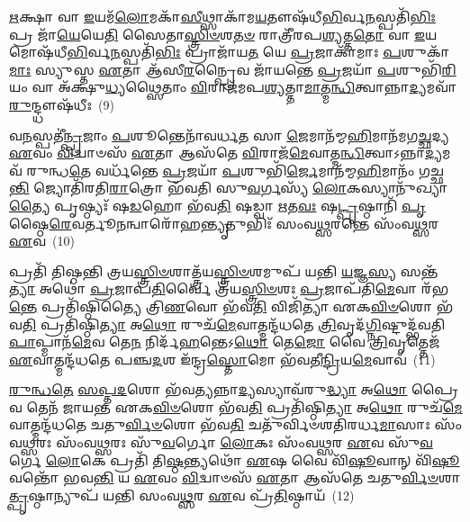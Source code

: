 {\anuvakamend[{\-\ul{𑌮}\-\-\ul{𑌨𑍁}\-𑌷𑍍𑌯᳴𑌸𑍍𑌯 𑌮\-\ul{𑌧𑍍𑌯}\-𑌤𑌃 \ul{𑌪}\-𑌶\-\ul{𑌵}\-𑌸𑍍𑌤𑌾𑌭𑍍𑌯𑌾᳴\-\ul{𑌮𑍇}\-𑌵 𑌸𑌂᳴𑌵\-\ul{𑌥𑍍𑌸}\-𑌰𑌶𑍍𑌚𑌤𑍁᳴𑌰𑍍𑌵𑌿𑍞𑌶𑌤𑌿𑌶𑍍𑌚}]}%

\-\ul{𑌋}\-𑌕𑍍𑌷𑌾 𑌵𑌾 \ul{𑌇}\-𑌯𑌮᳴\-\ul{𑌲𑍋}\-𑌮𑌕𑌾᳴\-\ul{𑌸𑍀}\-𑌥𑍍𑌸𑌾𑌕𑌾᳴𑌮\-\ul{𑌯}\-𑌤𑍗𑌷᳴𑌧𑍀\-\ul{𑌭𑌿}\-𑌰𑍍𑌵\-\ul{𑌨}\-𑌸𑍍𑌪𑌤𑌿᳴\-\ul{𑌭𑌿𑌃} 𑌪𑍍𑌰 𑌜𑌾᳴\-\ul{𑌯𑍇}\-𑌯𑍇\-\ul{𑌤𑌿} 𑌸𑍈𑌤𑌾\-\ul{𑌸𑍍𑌤𑍍𑌰𑌿}\-\-\ul{𑍞}\-𑌶\-\ul{𑌤}\-\-\ul{𑍞} 𑌰𑌾𑌤𑍍𑌰𑍀᳴𑌰𑌪\-\ul{𑌶𑍍𑌯}\-𑌤𑍍𑌤\-\ul{𑌤𑍋} 𑌵𑌾 \ul{𑌇}\-𑌯𑌮𑍋𑌷᳴𑌧𑍀\-\ul{𑌭𑌿}\-𑌰𑍍𑌵\-\ul{𑌨}\-𑌸𑍍𑌪𑌤𑌿᳴\-\ul{𑌭𑌿𑌃} 𑌪𑍍𑌰𑌾𑌜𑌾᳴𑌯\-\ul{𑌤} 𑌯𑍇 \ul{𑌪𑍍𑌰}\-𑌜𑌾𑌕𑌾᳴𑌮𑌾𑌃 \ul{𑌪}\-𑌶𑍁𑌕𑌾᳴\-\ul{𑌮𑌾𑌃} 𑌸𑍍𑌯𑍁𑌸𑍍𑌤 \ul{𑌏}\-𑌤𑌾 𑌆᳴𑌸𑍀\-\ul{𑌰}\-𑌨𑍍𑌪𑍍𑌰𑍈𑌵 𑌜𑌾᳴𑌯𑌨𑍍𑌤𑍇 \ul{𑌪𑍍𑌰}\-𑌜𑌯𑌾᳴ \ul{𑌪}\-𑌶𑍁𑌭𑌿᳴\-\ul{𑌰𑌿}\-𑌯𑌂 𑌵𑌾 𑌅᳴𑌕𑍍𑌷𑍁\-\ul{𑌧𑍍𑌯}\-𑌥𑍍𑌸𑍈𑌤𑌾𑌂 \ul{𑌵𑌿}\-𑌰𑌾𑌜᳴𑌮𑌪\-\ul{𑌶𑍍𑌯}\-𑌤𑍍𑌤𑌾\-\ul{𑌮𑌾}\-𑌤𑍍𑌮\-\ul{𑌨𑍍𑌧𑌿}\-𑌤𑍍𑌵𑌾𑌨𑍍𑌨𑌾\-\ul{𑌦𑍍𑌯}\-𑌮𑌵𑌾᳴\-\ul{𑌰𑍁}\-𑌨𑍍𑌦𑍍𑌧𑍗𑌷᳴𑌧𑍀𑌃~(9)

𑌵\-\ul{𑌨}\-𑌸𑍍𑌪𑌤𑍀॑\-\ul{𑌨𑍍𑌪𑍍𑌰}\-𑌜𑌾𑌂 \ul{𑌪}\-𑌶𑍂𑌨𑍍𑌤𑍇𑌨𑌾᳴𑌵𑌰𑍍𑌧\-\ul{𑌤} 𑌸𑌾 \ul{𑌜𑍇}\-𑌮𑌾𑌨᳴𑌮𑍍𑌮\-\ul{𑌹𑌿}\-𑌮𑌾𑌨᳴𑌮𑌗\-\ul{𑌚𑍍𑌛}\-𑌦𑍍𑌯 \ul{𑌏}\-𑌵𑌂 \ul{𑌵𑌿}\-𑌦𑍍𑌵𑌾𑍞𑌸᳴ \ul{𑌏}\-𑌤𑌾 𑌆𑌸᳴𑌤𑍇 \ul{𑌵𑌿}\-𑌰𑌾𑌜᳴\-\ul{𑌮𑍇}\-𑌵𑌾𑌤𑍍𑌮\-\ul{𑌨𑍍𑌧𑌿}\-𑌤𑍍𑌵𑌾\-𑌽𑌨𑍍𑌨𑌾\-\ul{𑌦𑍍𑌯}\-𑌮𑌵᳴ 𑌰𑍁𑌨𑍍𑌧\-\ul{𑌤𑍇} 𑌵𑌰𑍍𑌧᳴𑌨𑍍𑌤𑍇 \ul{𑌪𑍍𑌰}\-𑌜𑌯𑌾᳴ \ul{𑌪}\-𑌶𑍁𑌭𑌿᳴\-\ul{𑌰𑍍𑌜𑍇}\-𑌮𑌾𑌨᳴𑌮𑍍𑌮\-\ul{𑌹𑌿}\-𑌮𑌾𑌨𑌂᳴ 𑌗𑌚𑍍𑌛\-\ul{𑌨𑍍𑌤𑌿} 𑌜𑍍𑌯𑍋𑌤𑌿᳴𑌰𑌤𑌿\-\ul{𑌰𑌾}\-𑌤𑍍𑌰𑍋 𑌭᳴𑌵𑌤𑌿 𑌸𑍁\-\ul{𑌵}\-𑌰𑍍𑌗𑌸𑍍𑌯᳴ \ul{𑌲𑍋}\-𑌕𑌸𑍍𑌯𑌾𑌨𑍁᳴\-𑌖𑍍𑌯𑌾\-\ul{𑌤𑍍𑌯𑍈} 𑌪𑍃𑌷𑍍𑌠𑍍𑌯𑌃᳴ 𑌷\-\ul{𑌡}\-𑌹𑍋 𑌭᳴𑌵\-\ul{𑌤𑌿} 𑌷𑌡𑍍𑌵𑌾 \ul{𑌋}\-𑌤\-\ul{𑌵𑌃} 𑌷\-\ul{𑌟𑍍𑌪𑍃}\-𑌷𑍍𑌠𑌾𑌨𑌿᳴ \ul{𑌪𑍃}\-𑌷𑍍𑌠𑍈\-\ul{𑌰𑍇}\-𑌵𑌰𑍍𑌤𑍂\-\ul{𑌨}\-𑌨𑍍𑌵𑌾𑌰𑍋᳴𑌹\-\ul{𑌨𑍍𑌤𑍍𑌯𑍃}\-𑌤𑍁𑌭𑌿𑌃᳴ 𑌸𑌂𑌵\-\ul{𑌥𑍍𑌸}\-𑌰𑌨𑍍𑌤𑍇 𑌸𑌂᳴𑌵\-\ul{𑌥𑍍𑌸}\-𑌰 \ul{𑌏}\-𑌵~(10)

𑌪𑍍𑌰𑌤𑌿᳴ 𑌤𑌿𑌷𑍍𑌠𑌨𑍍𑌤𑌿 𑌤𑍍𑌰𑌯\-\ul{𑌸𑍍𑌤𑍍𑌰𑌿}\-\-\ul{𑍞}\-𑌶𑌾𑌤𑍍𑌤𑍍𑌰᳴𑌯\-\ul{𑌸𑍍𑌤𑍍𑌰𑌿}\-\-\ul{𑍞}\-𑌶𑌮𑍁𑌪᳴ 𑌯𑌨𑍍𑌤𑌿 \ul{𑌯}\-𑌜𑍍𑌞\-\ul{𑌸𑍍𑌯} 𑌸𑌨𑍍𑌤᳴\-\ul{𑌤𑍍𑌯𑌾} 𑌅𑌥𑍋॑ \ul{𑌪𑍍𑌰}\-𑌜𑌾𑌪᳴\-\ul{𑌤𑌿}\-𑌰𑍍𑌵𑍈 𑌤𑍍𑌰᳴𑌯\-\ul{𑌸𑍍𑌤𑍍𑌰𑌿}\-\-\ul{𑍞}\-𑌶𑌃 \ul{𑌪𑍍𑌰}\-𑌜𑌾𑌪᳴𑌤𑌿\-\ul{𑌮𑍇}\-𑌵𑌾 𑌰᳴𑌭\-\ul{𑌨𑍍𑌤𑍇} 𑌪𑍍𑌰𑌤𑌿᳴𑌷𑍍𑌠𑌿𑌤𑍍𑌯𑍈 𑌤𑍍𑌰𑌿\-\ul{𑌣}\-𑌵𑍋 𑌭᳴𑌵\-\ul{𑌤𑌿} 𑌵𑌿𑌜𑌿᳴𑌤𑍍𑌯𑌾 𑌏𑌕\-\ul{𑌵𑌿}\-\-\ul{𑍞}\-𑌶𑍋 𑌭᳴𑌵\-\ul{𑌤𑌿} 𑌪𑍍𑌰𑌤𑌿᳴𑌷𑍍𑌠𑌿\-\ul{𑌤𑍍𑌯𑌾} 𑌅\-\ul{𑌥𑍋} 𑌰𑍁𑌚᳴\-\ul{𑌮𑍇}\-𑌵𑌾𑌤𑍍𑌮𑌨𑍍𑌦᳴𑌧𑌤𑍇 \ul{𑌤𑍍𑌰𑌿}\-𑌵𑍃𑌦᳴\-\ul{𑌗𑍍𑌨𑌿}\-𑌷𑍍𑌟𑍁𑌦𑍍𑌭᳴𑌵𑌤𑌿 \ul{𑌪𑌾}\-𑌪𑍍𑌮𑌾𑌨᳴\-\ul{𑌮𑍇}\-𑌵 𑌤𑍇\-\ul{𑌨} 𑌨𑌿𑌰𑍍𑌦᳴\-\ul{𑌹}\-𑌨𑍍𑌤𑍇\-𑌽\-\ul{𑌥𑍋} 𑌤𑍇\-\ul{𑌜𑍋} 𑌵𑍈 \ul{𑌤𑍍𑌰𑌿}\-𑌵𑍃𑌤𑍍𑌤𑍇𑌜᳴ \ul{𑌏}\-𑌵𑌾𑌤𑍍𑌮𑌨𑍍𑌦᳴𑌧𑌤𑍇 𑌪𑌞𑍍𑌚\-\ul{𑌦}\-𑌶 𑌇᳴𑌨𑍍𑌦𑍍𑌰\-\ul{𑌸𑍍𑌤𑍋}\-𑌮𑍋 𑌭᳴𑌵𑌤𑍀\-\ul{𑌨𑍍𑌦𑍍𑌰𑌿}\-𑌯\-\ul{𑌮𑍇}\-𑌵𑌾𑌵᳴~(11)

\-\ul{𑌰𑍁}\-\-\ul{𑌨𑍍𑌧}\-\-\ul{𑌤𑍇} \ul{𑌸}\-\-\ul{𑌪𑍍𑌤}\-\-\ul{𑌦}\-𑌶𑍋 𑌭᳴𑌵\-\ul{𑌤𑍍𑌯}\-𑌨𑍍𑌨𑌾\-\ul{𑌦𑍍𑌯}\-𑌸𑍍𑌯𑌾𑌵᳴𑌰𑍁\-\ul{𑌦𑍍𑌧𑍍𑌯𑌾} 𑌅\-\ul{𑌥𑍋} 𑌪𑍍𑌰𑍈𑌵 𑌤𑍇𑌨᳴ 𑌜𑌾𑌯𑌨𑍍𑌤 𑌏𑌕\-\ul{𑌵𑌿}\-\-\ul{𑍞}\-𑌶𑍋 𑌭᳴𑌵\-\ul{𑌤𑌿} 𑌪𑍍𑌰𑌤𑌿᳴𑌷𑍍𑌠𑌿\-\ul{𑌤𑍍𑌯𑌾} 𑌅\-\ul{𑌥𑍋} 𑌰𑍁𑌚᳴\-\ul{𑌮𑍇}\-𑌵𑌾𑌤𑍍𑌮𑌨𑍍𑌦᳴𑌧𑌤𑍇 𑌚𑌤𑍁\-\ul{𑌰𑍍𑌵𑌿}\-\-\ul{𑍞}\-𑌶𑍋 𑌭᳴𑌵\-\ul{𑌤𑌿} 𑌚𑌤𑍁᳴𑌰𑍍𑌵𑌿𑍞𑌶𑌤𑌿𑌰𑌰𑍍𑌧\-\ul{𑌮𑌾}\-𑌸𑌾𑌃 𑌸𑌂᳴𑌵\-\ul{𑌥𑍍𑌸}\-𑌰𑌃 𑌸𑌂᳴𑌵\-\ul{𑌥𑍍𑌸}\-𑌰𑌃 𑌸𑍁᳴\-\ul{𑌵}\-𑌰𑍍𑌗𑍋 \ul{𑌲𑍋}\-𑌕𑌃 𑌸𑌂᳴𑌵\-\ul{𑌥𑍍𑌸}\-𑌰 \ul{𑌏}\-𑌵 𑌸𑍁᳴\-\ul{𑌵}\-𑌰𑍍𑌗𑍇 \ul{𑌲𑍋}\-𑌕𑍇 𑌪𑍍𑌰𑌤𑌿᳴ 𑌤𑌿\-\ul{𑌷𑍍𑌠}\-𑌨𑍍𑌤𑍍𑌯𑌥𑍋᳴ \ul{𑌏}\-𑌷 𑌵𑍈 𑌵𑌿᳴\-\ul{𑌷𑍂}\-𑌵𑌾𑌨𑍍 𑌵𑌿᳴\-\ul{𑌷𑍂}\-𑌵𑌨𑍍𑌤𑍋᳴ 𑌭𑌵\-\ul{𑌨𑍍𑌤𑌿} 𑌯 \ul{𑌏}\-𑌵𑌂 \ul{𑌵𑌿}\-𑌦𑍍𑌵𑌾𑍞𑌸᳴ \ul{𑌏}\-𑌤𑌾 𑌆𑌸᳴𑌤𑍇 𑌚𑌤𑍁\-\ul{𑌰𑍍𑌵𑌿}\-\-\ul{𑍞}\-𑌶𑌾\-\ul{𑌤𑍍𑌪𑍃}\-𑌷𑍍𑌠𑌾𑌨𑍍𑌯𑍁𑌪᳴ 𑌯𑌨𑍍𑌤𑌿 𑌸𑌂𑌵\-\ul{𑌥𑍍𑌸}\-𑌰 \ul{𑌏}\-𑌵 𑌪𑍍𑌰᳴\-\ul{𑌤𑌿}\-𑌷𑍍𑌠𑌾𑌯᳴~(12)

